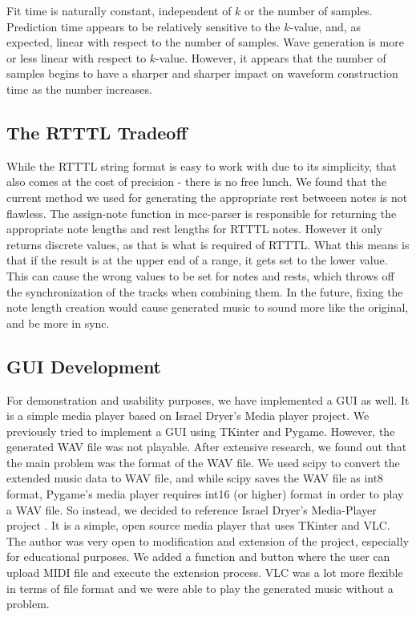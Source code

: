 \documentclass{article}
\begin{document}
Fit time is naturally constant, independent of $k$ or the number of samples. Prediction time appears to be relatively sensitive to the $k$-value, and, as expected, linear 
with respect to the number of samples. Wave generation is more or less linear with respect to $k$-value. However, it appears that the number of samples begins to have a 
sharper and sharper impact on waveform construction time as the number increases.

\subsection{The RTTTL Tradeoff}
While the RTTTL string format is easy to work with due to its simplicity, that also comes at the cost of precision - there is no free lunch. We found that the current method 
we used for generating the appropriate rest betweeen notes is not flawless. The assign-note function in mcc-parser is responsible for returning the appropriate note lengths 
and rest lengths for RTTTL notes. However it only returns discrete values, as that is what is required of RTTTL. What this means is that if the result is at the upper end of a 
range, it gets set to the lower value. This can cause the wrong values to be set for notes and rests, which throws off the synchronization of the tracks when combining them. 
In the future, fixing the note length creation would cause generated music to sound more like the original, and be more in sync.

\subsection{GUI Development}
For demonstration and usability purposes, we have implemented a GUI as well. It is a simple media player based on Israel Dryer's Media player project. We previously tried 
to implement a GUI using TKinter and Pygame. However, the generated WAV file was not playable. After extensive research, we found out that the main problem was the format 
of the WAV file. We used scipy to convert the extended music data to WAV file, and while scipy saves the WAV file as int8 format,
Pygame's media player requires int16 (or higher) format in order to play a WAV file. So instead, we decided to reference Israel Dryer's Media-Player project \cite{media_player}.
It is a simple, open source media player that uses TKinter and VLC. The author was very open to modification and extension of the project, especially for educational purposes.
We added a function and button where the user can upload MIDI file and execute the extension process. VLC was a lot more flexible in terms of file format and we were able 
to play the generated music without a problem.
\end{document}

